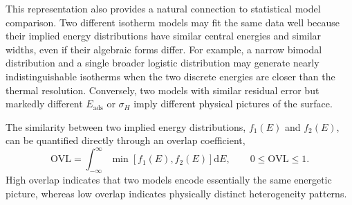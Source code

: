 \documentclass[journal=jacsat,manuscript=article]{achemso}
\begin{document}
	This representation also provides a natural connection to statistical model comparison. Two different isotherm models may fit the same data well because their implied energy distributions have similar central energies and similar widths, even if their algebraic forms differ. For example, a narrow bimodal distribution and a single broader logistic distribution may generate nearly indistinguishable isotherms when the two discrete energies are closer than the thermal resolution. Conversely, two models with similar residual error but markedly different $E_{\mathrm{ads}}$ or $\sigma_H$ imply different physical pictures of the surface.
	
	The similarity between two implied energy distributions, $f_1(E)$ and $f_2(E)$, can be quantified directly through an overlap coefficient,
	\begin{equation}
		\mathrm{OVL}
		=
		\int_{-\infty}^{\infty}
		\min\!\left[f_1(E),f_2(E)\right]\mathrm{d}E,
		\qquad
		0 \leq \mathrm{OVL} \leq 1.
		\label{eq:ovl_main}
	\end{equation}
	High overlap indicates that two models encode essentially the same energetic picture, whereas low overlap indicates physically distinct heterogeneity patterns. %
	
\end{document}
